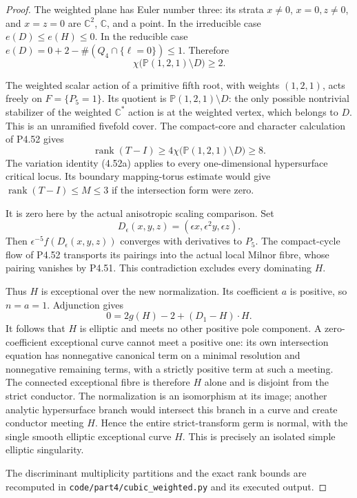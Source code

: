 \begin{proof}
The weighted plane has Euler number three: its
strata $x\ne0$, $x=0,z\ne0$, and $x=z=0$ are
$\mathbb C^2$, $\mathbb C$, and a point.
In the irreducible case $e(D)\le e(H)\le0$.
In the reducible case
$e(D)=0+2-\#(Q_4\cap\{\ell=0\})\le1$.
Therefore
\[
               \chi\bigl(\mathbb P(1,2,1)\setminus D\bigr)
                         \ge2.                            \tag{4.53e}
\]

The weighted scalar action of a primitive fifth
root, with weights $(1,2,1)$, acts freely on
$F=\{P_5=1\}$. Its quotient is
$\mathbb P(1,2,1)\setminus D$: the only possible
nontrivial stabilizer of the weighted
$\mathbb C^*$ action is at the weighted vertex,
which belongs to $D$. This is an unramified
fivefold cover. The compact-core and character
calculation of P4.52 gives
\[
 \operatorname{rank}(T-I)
 \ge4\chi\bigl(\mathbb P(1,2,1)\setminus D\bigr)
 \ge8.
\]
The variation identity (4.52a) applies to every
one-dimensional hypersurface critical locus. Its
boundary mapping-torus estimate would give
$\operatorname{rank}(T-I)\le M\le3$ if the
intersection form were zero.

It is zero here by the actual anisotropic scaling
comparison. Set
\[
 D_\epsilon(x,y,z)=(\epsilon x,\epsilon^2y,\epsilon z).
\]
Then $\epsilon^{-5}f(D_\epsilon(x,y,z))$ converges
with derivatives to $P_5$. The compact-cycle flow
of P4.52 transports its pairings into the actual
local Milnor fibre, whose pairing vanishes by
P4.51. This contradiction excludes every dominating
$H$.

Thus $H$ is exceptional over the new normalization.
Its coefficient $a$ is positive, so $n=a=1$.
Adjunction gives
\[
                    0=2g(H)-2+(D_1-H)\cdot H.
\]
It follows that $H$ is elliptic and meets no other
positive pole component. A zero-coefficient
exceptional curve cannot meet a positive one:
its own intersection equation has nonnegative
canonical term on a minimal resolution and
nonnegative remaining terms, with a strictly
positive term at such a meeting. The connected
exceptional fibre is therefore $H$ alone and is
disjoint from the strict conductor. The
normalization is an isomorphism at its image;
another analytic hypersurface branch would
intersect this branch in a curve and create
conductor meeting $H$. Hence the entire
strict-transform germ is normal, with the single
smooth elliptic exceptional curve $H$. This is
precisely an isolated simple elliptic singularity.

The discriminant multiplicity partitions and the
exact rank bounds are recomputed in
\texttt{code/part4/cubic\_weighted.py} and its
executed output.
\end{proof}
